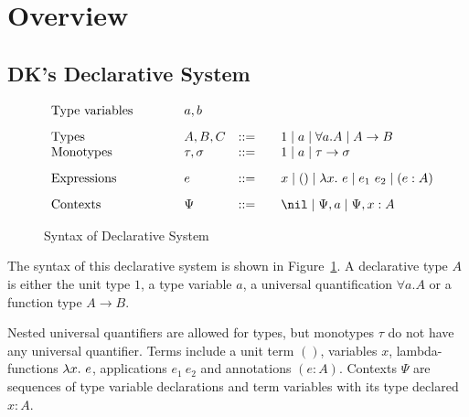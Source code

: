 \section{Overview}


\subsection{DK's Declarative System}

\begin{figure}[t]
\[
\begin{array}{l@{\qquad}lcl}
\text{Type variables}\qquad&a, b
\\[3mm]
\text{Types}\qquad&A, B, C &::=&\quad 1 \mid a \mid \forall a. A \mid A\to B\\
\text{Monotypes}\qquad&\tau,\sigma &::=&\quad 1 \mid a \mid \tau\to \sigma
\\[3mm]
\text{Expressions}\qquad&e &::=&\quad x \mid () \mid \lam e \mid e_1~e_2 \mid (e:A)
\\[3mm]
\text{Contexts}\qquad&\Psi &::=&\quad \nil \mid \Psi, a \mid \Psi, x:A
\end{array}
\]
\caption{Syntax of Declarative System}\label{fig:decl:syntax}
\end{figure}

The syntax of this declarative system is shown in Figure~\ref{fig:decl:syntax}.
A declarative type $A$ is either the unit type $1$, a type variable $a$,
a universal quantification $\forall a. A$ or a function type $A \to B$.

Nested universal quantifiers are allowed for types,
but monotypes $\tau$ do not have any universal quantifier.
Terms include a unit term $()$, variables $x$, lambda-functions $\lam e$,
applications $e_1~e_2$ and annotations $(e:A)$.
Contexts $\Psi$ are sequences of type variable declarations and
term variables with its type declared $x:A$.

